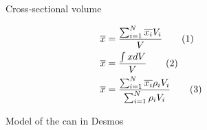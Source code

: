 \documentclass[11pt]{article}
\newcommand{\numberthis}{\addtocounter{equation}{1}\tag{\theequation}}
\begin{document}
    \begin{minipage}{.4\textwidth}
        \begin{figure}[H]
            \centering
            \vspace{-10pt}
            \caption{Cross-sectional volume}
            \label{fig:volume-crosssection}
        \end{figure}
    \end{minipage}%
    \begin{minipage}{.6\textwidth}
        \begin{align*}
            \overline{x} &= \frac{\sum_{i=1}^N \overline{x_i} V_i}{V} \numberthis{\label{eq:CM-sum}} \\
            \overline{x} &= \frac{\int x dV}{V} \numberthis{\label{eq:CM-integral}} \\
            \overline{x} &= \frac{\sum_{i=1}^N \overline{x_i} \rho_i V_i}{\sum_{i=1}^N \rho_i V_i} \numberthis{\label{eq:CM-density}}
        \end{align*}
    \end{minipage}
    \vspace{6pt}

    \begin{figure}
        \centering
        \vspace{-10pt}
        \caption{Model of the can in Desmos}
        \label{fig:desmos-model}
    \end{figure}
\end{document}
